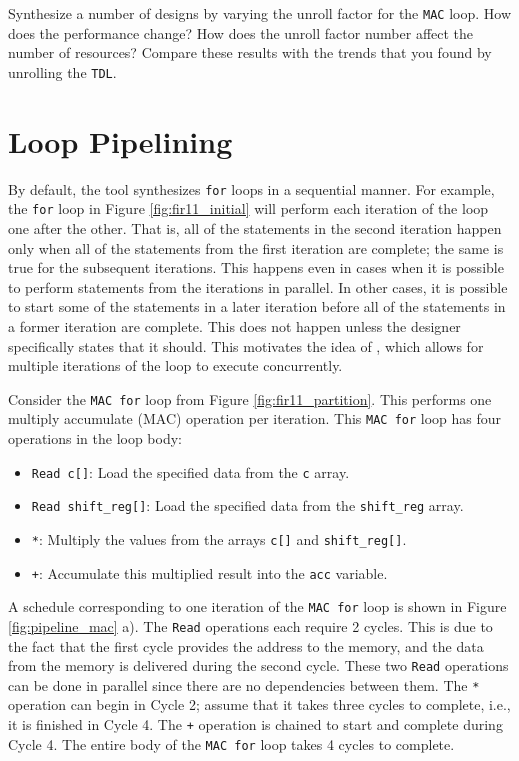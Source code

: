 \begin{exercise}
Synthesize a number of designs by varying the unroll factor for the \lstinline{MAC} loop. How does the performance change? How does the unroll factor number affect the number of resources? Compare these results with the trends that you found by unrolling the \lstinline{TDL}.   
\end{exercise}


\section{Loop Pipelining}

By default, the \VHLS tool synthesizes \lstinline{for} loops in a sequential manner. For example, the \lstinline{for} loop in Figure \ref{fig:fir11_initial} will perform each iteration of the loop one after the other. That is, all of the statements in the second iteration happen only when all of the statements from the first iteration are complete; the same is true for the subsequent iterations. This happens even in cases when it is possible to perform statements from the iterations in parallel. In other cases, it is possible to start some of the statements in a later iteration before all of the statements in a former iteration are complete. This does not happen unless the designer specifically states that it should. This motivates the idea of , which allows for multiple iterations of the loop to execute concurrently.

Consider the \lstinline{MAC for} loop from Figure \ref{fig:fir11_partition}. This performs one multiply accumulate (MAC) operation per iteration.  This \lstinline{MAC for} loop has four operations in the loop body:
\begin{itemize}
\item \lstinline{Read c[]}: Load the specified data from the \lstinline{c} array.
\item \lstinline{Read shift_reg[]}: Load the specified data from the \lstinline{shift_reg} array.
\item \lstinline{*}: Multiply the values from the arrays \lstinline{c[]} and \lstinline{shift_reg[]}.
\item \lstinline{+}: Accumulate this multiplied result into the \lstinline{acc} variable.
\end{itemize}

A schedule corresponding to one iteration of the \lstinline{MAC for} loop is shown in Figure \ref{fig:pipeline_mac} a). The \lstinline{Read} operations each require 2 cycles. This is due to the fact that the first cycle provides the address to the memory, and the data from the memory is delivered during the second cycle.  These two \lstinline{Read} operations can be done in parallel since there are no dependencies between them. The \lstinline{*} operation can begin in Cycle 2; assume that it takes three cycles to complete, i.e., it is finished in Cycle 4. The \lstinline{+} operation is chained to start and complete during Cycle 4. The entire body of the \lstinline{MAC for} loop takes 4 cycles to complete.

